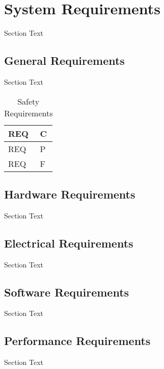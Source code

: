 %

\setcounter{section}{2}
\section{System Requirements}
Section Text


\break
\subsection{General Requirements}
Section Text

\bgroup
\def\arraystretch{1.5}
\begin{table}[H]
\centering
\begin{tabular}{ | m{3cm} | m{13cm}| }
\hline
REQ & C\\
\hline
REQ & P\\
\hline
REQ & F\\
\hline
\end{tabular}
\caption{Safety Requirements}
\end{table}

\break
\subsection{Hardware Requirements}
Section Text


\break
\subsection{Electrical Requirements}
Section Text


\break
\subsection{Software Requirements}
Section Text


\break
\subsection{Performance Requirements}
Section Text



%
